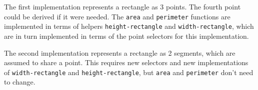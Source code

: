 \documentclass{article}
\begin{document}
The first implementation represents a rectangle as 3 points. The fourth point
could be derived if it were needed. The \texttt{area} and \texttt{perimeter}
functions are implemented in terms of helpers \texttt{height-rectangle} and
\texttt{width-rectangle}, which are in turn implemented in terms of the point
selectors for this implementation.


The second implementation represents a rectangle as 2 segments, which are
assumed to share a point. This requires new selectors and new implementations of
\texttt{width-rectangle} and \texttt{height-rectangle}, but \texttt{area} and
\texttt{perimeter} don't need to change.

\end{document}
